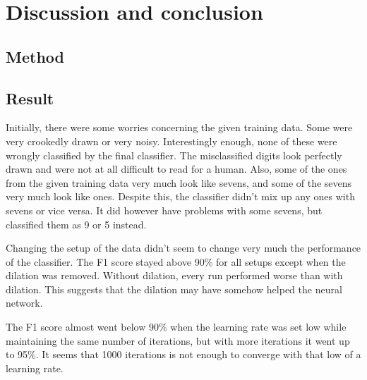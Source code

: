 \documentclass[report.tex]{subfile}
\begin{document}
\section{Discussion and conclusion}

\subsection{Method}

\subsection{Result}
Initially, there were some worries concerning the given training data. Some
were very crookedly drawn or very noisy. Interestingly enough, none of these
were wrongly classified by the final classifier. The misclassified digits look
perfectly drawn and were not at all difficult to read for a human. Also, some
of the ones from the given training data very much look like sevens, and some
of the sevens very much look like ones. Despite this, the classifier didn't mix
up any ones with sevens or vice versa. It did however have problems with some
sevens, but classified them as 9 or 5 instead.

Changing the setup of the data didn't seem to change very much the performance
of the classifier. The F1 score stayed above 90\% for all setups except when
the dilation was removed. Without dilation, every run performed worse than with
dilation. This suggests that the dilation may have somehow helped the neural
network.

The F1 score almost went below 90\% when the learning rate was set low while
maintaining the same number of iterations, but with more iterations it went up
to 95\%. It seems that 1000 iterations is not enough to converge with that low
of a learning rate.
\end{document}
